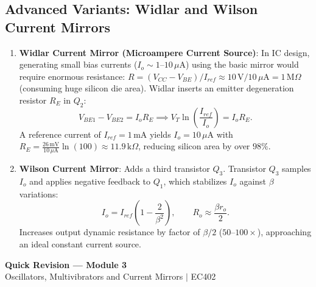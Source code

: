 \documentclass[12pt,a4paper]{article}
\begin{document}
\subsection{Advanced Variants: Widlar and Wilson Current Mirrors}
\begin{enumerate}[leftmargin=1.5em, itemsep=3pt]
  \item \textbf{Widlar Current Mirror (Microampere Current Source)}:
  In IC design, generating small bias currents ($I_o \sim 1$--$10\,\mu\mathrm{A}$) using the basic mirror would require enormous resistance: $R = (V_{CC}-V_{BE})/I_{ref} \approx 10\,\mathrm{V}/10\,\mu\mathrm{A} = 1\,\mathrm{M}\Omega$ (consuming huge silicon die area). Widlar inserts an emitter degeneration resistor $R_E$ in $Q_2$:
  \[
  V_{BE1} - V_{BE2} = I_o R_E \implies V_T \ln\left(\frac{I_{ref}}{I_o}\right) = I_o R_E.
  \]
  A reference current of $I_{ref} = 1\,\mathrm{mA}$ yields $I_o = 10\,\mu\mathrm{A}$ with $R_E = \frac{26\,\mathrm{mV}}{10\,\mu\mathrm{A}}\ln(100) \approx 11.9\,\mathrm{k}\Omega$, reducing silicon area by over $98\%$.
  \item \textbf{Wilson Current Mirror}:
  Adds a third transistor $Q_3$. Transistor $Q_3$ samples $I_o$ and applies negative feedback to $Q_1$, which stabilizes $I_o$ against $\beta$ variations:
  \[
  I_o = I_{ref}\left(1 - \frac{2}{\beta^2}\right),\qquad
  R_o \approx \frac{\beta r_o}{2}.
  \]
  Increases output dynamic resistance by factor of $\beta/2$ ($50$--$100\times$), approaching an ideal constant current source.
\end{enumerate}

\newpage

\begin{center}
  {\large\bfseries\color{myred} Quick Revision --- Module 3}\\[3pt]
  {\small\color{mydark} Oscillators, Multivibrators and Current Mirrors $|$ EC402}
\end{center}
\noindent{\color{myred}\rule{\linewidth}{1.2pt}}
\vspace{4pt}
\end{document}
